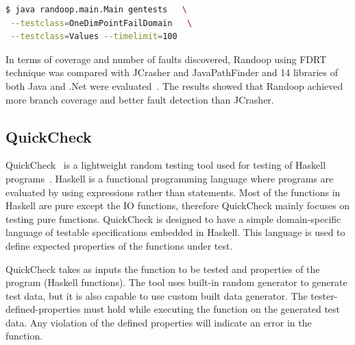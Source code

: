 \begin{lstlisting}[language=bash]
$ java randoop.main.Main gentests   \
 --testclass=OneDimPointFailDomain   \
 --testclass=Values --timelimit=100
\end{lstlisting}
\bigskip

In terms of coverage and number of faults discovered, Randoop using FDRT technique was compared with JCrasher and JavaPathFinder and 14 libraries of both Java and .Net were evaluated~\cite{visser2004test}. The results showed that Randoop achieved more branch coverage and better fault detection than JCrasher. 

\subsection{QuickCheck}
QuickCheck~\cite{claessen2011quickcheck} is a lightweight random testing tool used for testing of Haskell programs~\cite{hudak2007history}. Haskell is a functional programming language where programs are evaluated by using expressions rather than statements. Most of the functions in Haskell are pure except the IO functions, therefore QuickCheck mainly focuses on testing pure functions. QuickCheck is designed to have a simple domain-specific language of testable specifications embedded in Haskell. This language is used to define expected properties of the functions under test. %

QuickCheck takes as inputs the function to be tested and properties of the program (Haskell functions). The tool uses built-in random generator to generate test data, but it is also capable to use custom built data generator. The tester-defined-properties must hold while executing the function on the generated test data. Any violation of the defined properties will indicate an error in the function.







